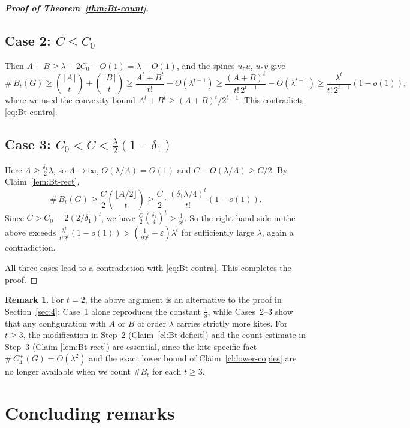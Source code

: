 \documentclass[11pt,a4paper]{article}
\theoremstyle{definition}
\newtheorem{remark}{Remark}
\theoremstyle{plain}
\renewcommand{\le}{\leqslant}
\renewcommand{\ge}{\geqslant}
\begin{document}
\begin{proof}[{\bf Proof of Theorem~\ref{thm:Bt-count}}]
\subsection*{Case 2: $C\le C_0$} 

Then $A+B\ge\lambda-2C_0-O(1)=\lambda-O(1)$, and
the spines $u_*u$, $u_*v$ give
\[
   \texttt{\#}\,B_t(G)\ge\binom{\lceil A\rceil}{t} \!+ \! \binom{\lceil B\rceil}{t}
   \ge\frac{A^t+B^t}{t!}-O(\lambda^{t-1})
   \ge\frac{(A+B)^t}{t!\,2^{t-1}}-O(\lambda^{t-1})
   \ge\frac{\lambda^t}{t!\,2^{t-1}}(1-o(1)),
\]
where we used the convexity bound $A^t+B^t\ge(A+B)^t/2^{t-1}$.  This contradicts
\eqref{eq:Bt-contra}.

\subsection*{Case 3: $C_0<C<\tfrac\lambda2(1-\delta_1)$}   

Here
$A\ge\tfrac{\delta_1}{2}\lambda$, so $A\to\infty$, $O(\lambda/A)=O(1)$ and
$C-O(\lambda/A)\ge C/2$.  By Claim~\ref{lem:Bt-rect},
\[
   \texttt{\#}\,B_t(G)\ge\frac{C}{2}\binom{\lfloor A/2\rfloor}{t}
   \ge\frac{C}{2}\cdot\frac{(\delta_1\lambda/4)^t}{t!}(1-o(1)).
\]
Since $C>C_0=2(2/\delta_1)^t$, we have
$\tfrac C2(\tfrac{\delta_1}{4})^t>\tfrac1{2^t}$. So the right-hand side in the above exceeds
$\tfrac{\lambda^t}{t!\,2^t}(1-o(1)) 
>(\tfrac1{t!2^t}-\varepsilon)
\lambda^t$ for sufficiently large $\lambda$, again a contradiction.

All three cases lead to a contradiction with 
\eqref{eq:Bt-contra}. This completes the proof. 
\end{proof}

\begin{remark}
For $t=2$, the above argument is an alternative to the proof in Section~\ref{sec:4}:
Case~1 alone reproduces the constant $\tfrac18$, while Cases~2--3 show that
any configuration with $A$ or $B$ of order $\lambda$ carries strictly more
kites.  For $t\ge3$, the modification in Step~2 (Claim~\ref{cl:Bt-deficit}) and
the count estimate in Step~3 (Claim \ref{lem:Bt-rect}) are essential, since the kite-specific fact 
$\texttt{\#}\,C_4^+(G)=O(\lambda^2)$ and the exact lower bound of Claim~\ref{cl:lower-copies} are no longer available when we count $\texttt{\#}B_t$ for each $t\ge 3$.
\end{remark}





\section{Concluding remarks}
\label{sec:concluding}
\end{document}
